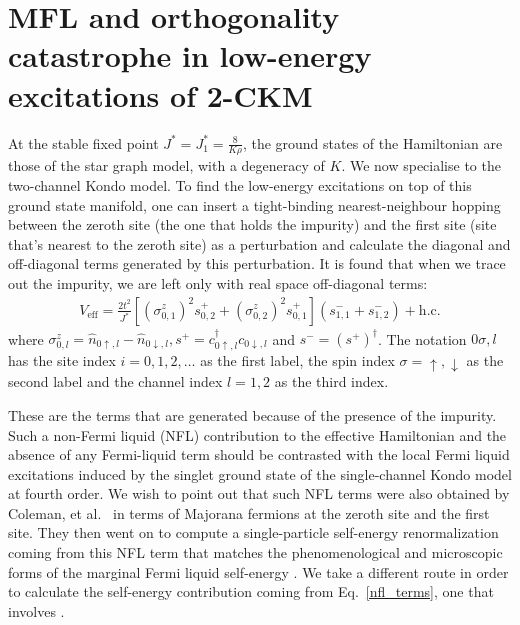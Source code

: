 \documentclass{revtex4-2}
\begin{document}
\section{MFL and orthogonality catastrophe in low-energy excitations of 2-CKM}
At the stable fixed point \(J ^* = J_1^* = \frac{8}{K \rho}\), the ground states of the Hamiltonian are those of the star graph model, with a degeneracy of \(K\). We now specialise to the two-channel Kondo model. To find the low-energy excitations on top of this ground state manifold, one can insert a tight-binding nearest-neighbour hopping between the zeroth site (the one that holds the impurity) and the first site (site that's nearest to the zeroth site) as a perturbation and calculate the diagonal and off-diagonal terms generated by this perturbation. It is found that when we trace out the impurity, we are left only with real space off-diagonal terms:
\begin{equation}\begin{aligned}
	\label{nfl_terms}
	V_\text{eff} = \frac{2t^2}{J^*}\left[\left(\sigma^z_{0,1}\right)^2 s^+_{0,2} + \left(\sigma^z_{0,2}\right)^2 s^+_{0,1}\right] \left(s^-_{1,1} + s^-_{1,2}\right) + \text{h.c.}
\end{aligned}\end{equation}
where \(\sigma^z_{0,l} = \hat n_{0\uparrow,l} - \hat n_{0\downarrow,l}, s^+ = c^\dagger_{0 \uparrow,l}c_{0 \downarrow,l}\) and \(s^- = \left(s^+\right)^\dagger\). The notation \(0\sigma,l\) has the site index \(i=0,1,2,\ldots\) as the first label, the spin index \(\sigma=\uparrow,\downarrow\) as the second label and the channel index \(l=1,2\) as the third index.

These are the terms that are generated because of the presence of the impurity. Such a non-Fermi liquid (NFL) contribution to the effective Hamiltonian and the absence of any Fermi-liquid term should be contrasted with the local Fermi liquid excitations induced by the singlet ground state of the single-channel Kondo model at fourth order. We wish to point out that such NFL terms were also obtained by Coleman, et al.~\cite{Coleman_tsvelik} in terms of Majorana fermions at the zeroth site and the first site. They then went on to compute a single-particle self-energy renormalization coming from this NFL term that matches the phenomenological \cite{varma2002singular} and microscopic forms of the marginal Fermi liquid self-energy \cite{anirbanmott1,anirbanurg1}. We take a different route in order to calculate the self-energy contribution coming from Eq.~\ref{nfl_terms}, one that involves \cite{anirbanmott1}.
\end{document}

